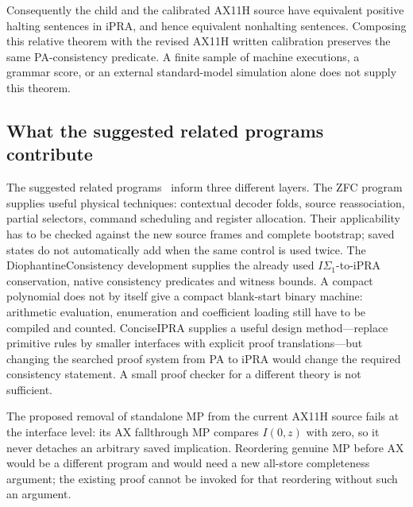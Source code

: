 Consequently the child and the calibrated AX11H source have equivalent
positive halting sentences in iPRA, and hence equivalent nonhalting
sentences.  Composing this relative theorem with the revised AX11H written
calibration preserves the same PA-consistency predicate.  A finite sample
of machine executions, a grammar score, or an external standard-model
simulation alone does not supply this theorem.

\subsection{What the suggested related programs contribute}

The suggested related programs~\cite{related} inform three different layers. The ZFC program supplies useful physical techniques: contextual decoder
folds, source reassociation, partial selectors, command scheduling and
register allocation.  Their applicability has to be checked against the
new source frames and complete bootstrap; saved states do not automatically
add when the same control is used twice.
The DiophantineConsistency development supplies the already used
$I\Sigma_1$-to-iPRA conservation, native consistency predicates and witness
bounds.  A compact polynomial does not by itself give a compact blank-start
binary machine: arithmetic evaluation, enumeration and coefficient loading
still have to be compiled and counted.
ConciseIPRA supplies a useful design method---replace primitive rules by
smaller interfaces with explicit proof translations---but changing the
searched proof system from PA to iPRA would change the required consistency
statement.  A small proof checker for a different theory is not sufficient.

The proposed removal of standalone MP from the current AX11H source fails
at the interface level: its AX fallthrough MP compares $I(0,z)$ with zero,
so it never detaches an arbitrary saved implication.  Reordering genuine
MP before AX would be a different program and would need a new all-store
completeness argument; the existing proof cannot be invoked for that
reordering without such an argument.

